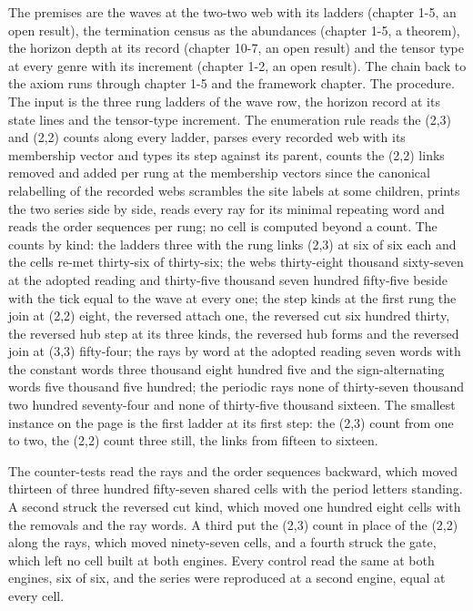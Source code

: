 \begin{chproof}[instrument]
The premises are the waves at the two-two web with its ladders (chapter 1-5, an open result), the termination census as the abundances (chapter 1-5, a theorem), the horizon depth at its record (chapter 10-7, an open result) and the tensor type at every genre with its increment (chapter 1-2, an open result). The chain back to the axiom runs through chapter 1-5 and the framework chapter. The procedure. The input is the three rung ladders of the wave row, the horizon record at its state lines and the tensor-type increment. The enumeration rule reads the (2,3) and (2,2) counts along every ladder, parses every recorded web with its membership vector and types its step against its parent, counts the (2,2) links removed and added per rung at the membership vectors since the canonical relabelling of the recorded webs scrambles the site labels at some children, prints the two series side by side, reads every ray for its minimal repeating word and reads the order sequences per rung; no cell is computed beyond a count. The counts by kind: the ladders three with the rung links (2,3) at six of six each and the cells re-met thirty-six of thirty-six; the webs thirty-eight thousand sixty-seven at the adopted reading and thirty-five thousand seven hundred fifty-five beside with the tick equal to the wave at every one; the step kinds at the first rung the join at (2,2) eight, the reversed attach one, the reversed cut six hundred thirty, the reversed hub step at its three kinds, the reversed hub forms and the reversed join at (3,3) fifty-four; the rays by word at the adopted reading seven words with the constant words three thousand eight hundred five and the sign-alternating words five thousand five hundred; the periodic rays none of thirty-seven thousand two hundred seventy-four and none of thirty-five thousand sixteen. The smallest instance on the page is the first ladder at its first step: the (2,3) count from one to two, the (2,2) count three still, the links from fifteen to sixteen.

The counter-tests read the rays and the order sequences backward, which moved thirteen of three hundred fifty-seven shared cells with the period letters standing. A second struck the reversed cut kind, which moved one hundred eight cells with the removals and the ray words. A third put the (2,3) count in place of the (2,2) along the rays, which moved ninety-seven cells, and a fourth struck the gate, which left no cell built at both engines. Every control read the same at both engines, six of six, and the series were reproduced at a second engine, equal at every cell.
\end{chproof}
\par\medskip{}\label{narr:close:4-3}\par
